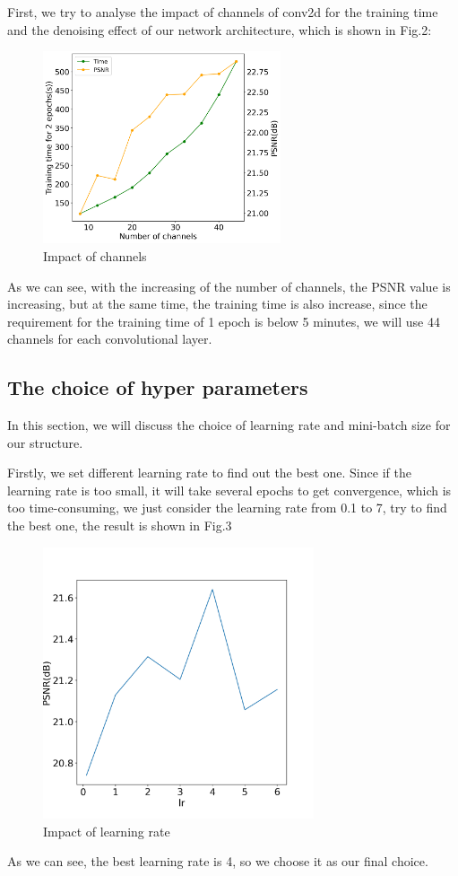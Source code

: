 First, we try to analyse the impact of channels of conv2d for the training time and the denoising effect of our network architecture, which is shown in Fig.2:
\begin{figure}[h]
    \begin{center}
        \includegraphics[width=7cm]{contents/channels.png}
        \caption{Impact of channels}
        \label{Impact of channels}
    \end{center}
\end{figure}

As we can see, with the increasing of the number of channels, the PSNR value is increasing, but at the same time, the training time is also increase, since the requirement for the training time of 1 epoch is below 5 minutes, we will use 44 channels for each convolutional layer.
\subsection{The choice of hyper parameters}
In this section, we will discuss the choice of learning rate and mini-batch size for our structure.

Firstly, we set different learning rate to find out the best one. Since if the learning rate is too small, it will take several epochs to get convergence, which is too time-consuming, we just consider the learning rate from 0.1 to 7, try to find the best one, the result is shown in Fig.3
\begin{figure}[h]
    \begin{center}
        \includegraphics[width=8cm]{contents/lr.png}
        \caption{Impact of learning rate}
        \label{Impact of learning rate}
    \end{center}
\end{figure}
As we can see, the best learning rate is 4, so we choose it as our final choice.

